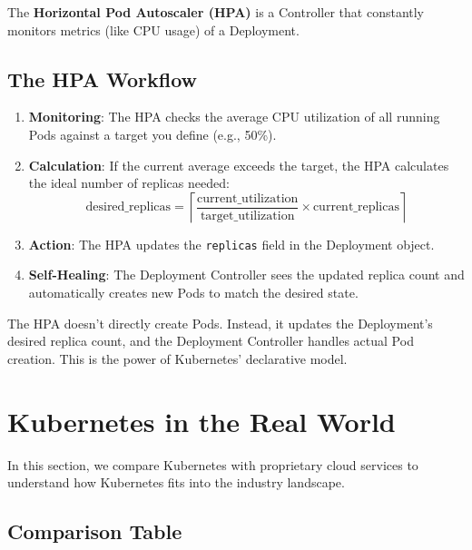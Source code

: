 \documentclass[12pt,a4paper]{article}
\begin{document}
The \textbf{Horizontal Pod Autoscaler (HPA)} is a Controller that constantly monitors metrics (like CPU usage) of a Deployment.

\subsection{The HPA Workflow}

\begin{enumerate}
    \item \textbf{Monitoring}: The HPA checks the average CPU utilization of all running Pods against a target you define (e.g., 50\%).

    \item \textbf{Calculation}: If the current average exceeds the target, the HPA calculates the ideal number of replicas needed:
    \[
    \text{desired\_replicas} = \left\lceil \frac{\text{current\_utilization}}{\text{target\_utilization}} \times \text{current\_replicas} \right\rceil
    \]

    \item \textbf{Action}: The HPA updates the \texttt{replicas} field in the Deployment object.

    \item \textbf{Self-Healing}: The Deployment Controller sees the updated replica count and automatically creates new Pods to match the desired state.
\end{enumerate}

\begin{importantbox}
The HPA doesn't directly create Pods. Instead, it updates the Deployment's desired replica count, and the Deployment Controller handles actual Pod creation. This is the power of Kubernetes' declarative model.
\end{importantbox}

\section{Kubernetes in the Real World}

In this section, we compare Kubernetes with proprietary cloud services to understand how Kubernetes fits into the industry landscape.

\subsection{Comparison Table}
\end{document}
